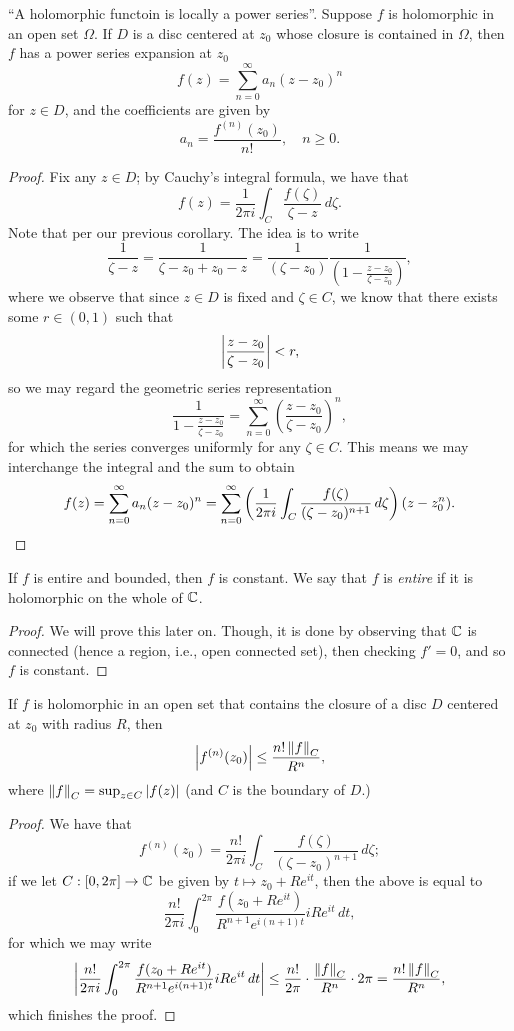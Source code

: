 \begin{theorem}
    ``A holomorphic functoin is locally a power series''. Suppose $f$ is holomorphic in an open set $\Omega$. If $D$ is a disc centered at $z_0$ whose closure is contained in $\Omega$, then $f$ has a power series expansion at $z_0$
    \[ f(z) = \sum_{n = 0}^\infty a_n (z - z_0)^n \]
    for $z \in D$, and the coefficients are given by
    \[ a_n = \frac{f^{(n)}(z_0)}{n!}, \quad n \geq 0. \]
\end{theorem}
\begin{proof}
    Fix any $z \in D$; by Cauchy's integral formula, we have that
    \[ f(z) = \frac{1}{2\pi i} \int_C \frac{f(\zeta)}{\zeta - z} \, d\zeta. \]
    Note that per our previous corollary. The idea is to write
    \[ \frac{1}{\zeta - z} = \frac{1}{\zeta - z_0 + z_0 - z} = \frac{1}{(\zeta - z_0)}\frac{1}{\left(1 - \frac{z - z_0}{\zeta - z_0}\right)}, \]
    where we observe that since $z \in D$ is fixed and $\zeta \in C$, we know that there exists some $r \in (0, 1)$ such that
    \[ \left\lvert \frac{z - z_0}{\zeta - z_0} \right\rvert < r, \]
    so we may regard the geometric series representation
    \[ \frac{1}{1 - \frac{z - z_0}{\zeta - z_0}} = \sum_{n=0}^\infty \left(\frac{z - z_0}{\zeta - z_0}\right)^n, \]
    for which the series converges uniformly for any $\zeta \in C$. This means we may interchange the integral and the sum to obtain
    \[ f(z) = \sum_{n=0}^\infty a_n (z - z_0)^n = \sum_{n=0}^\infty \left(\frac{1}{2 \pi i} \int_C \frac{f(\zeta)}{(\zeta - z_0)^{n+1}} \, d\zeta\right) (z - z_0^n). \qedhere \]
\end{proof}
\begin{corollary}
    If $f$ is entire and bounded, then $f$ is constant. We say that $f$ is \textit{entire} if it is holomorphic on the whole of $\mathbb C$.
\end{corollary}
\begin{proof}
    We will prove this later on. Though, it is done by observing that $\mathbb C$ is connected (hence a region, i.e., open connected set), then checking $f' = 0$, and so $f$ is constant.
\end{proof}
\begin{corollary}
    If $f$ is holomorphic in an open set that contains the closure of a disc $D$ centered at $z_0$ with radius $R$, then
    \[ \left\lvert f^{(n)}(z_0) \right\rvert \leq \frac{n! \left\lVert f \right\rVert_C}{R^n}, \]
    where $\left\lVert f \right\rVert_C = \sup_{z \in C} \left\lvert f(z) \right\rvert$ (and $C$ is the boundary of $D$.)
\end{corollary}
\begin{proof}
    We have that
    \[ f^{(n)}(z_0) = \frac{n!}{2\pi i} \int_C \frac{f(\zeta)}{(\zeta - z_0)^{n+1}} \, d\zeta; \]
    if we let $C : [0, 2\pi] \to \mathbb C$ be given by $t \mapsto z_0 + Re^{it}$, then the above is equal to
    \[ \frac{n!}{2 \pi i} \int_0^{2\pi} \frac{f(z_0 + Re^{it})}{R^{n+1} e^{i(n+1)t}} i Re^{it} \, dt, \]
    for which we may write
    \[ \left\lvert \frac{n!}{2 \pi i} \int_0^{2\pi} \frac{f(z_0 + Re^{it})}{R^{n+1} e^{i(n+1)t}} i Re^{it} \, dt \right\rvert \leq \frac{n!}{2\pi} \cdot \frac{\left\lVert f \right\rVert_C}{R^n} \cdot 2\pi = \frac{n! \left\lVert f \right\rVert_C}{R^n}, \]
    which finishes the proof.
\end{proof}